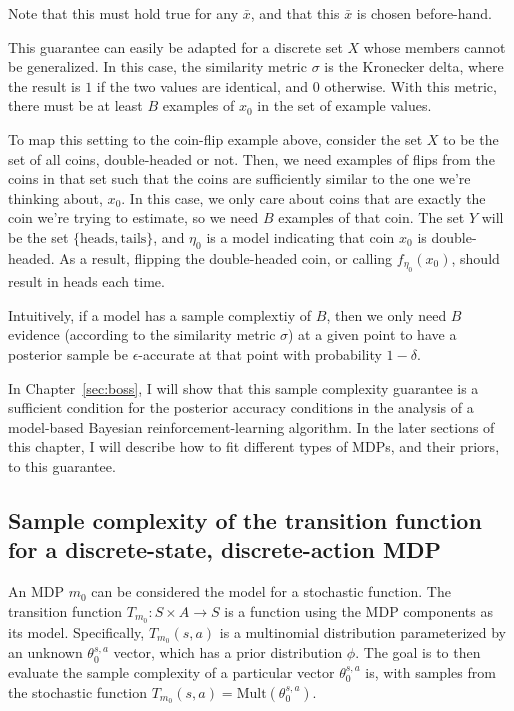 Note that this must hold true for any $\bar x$, and that this $\bar x$ is chosen before-hand.

This guarantee can easily be adapted for a discrete set $X$ whose members cannot be generalized. In this case, the similarity metric $\sigma$ is the Kronecker delta, where the result is $1$ if the two values are identical, and $0$ otherwise. With this metric, there must be at least $B$ examples of $x_0$ in the set of example values. 


To map this setting to the coin-flip example above, consider the set $X$ to be the set of all coins, double-headed or not. Then, we need examples of flips from the coins in that set such that the coins are sufficiently similar to the one we're thinking about, $x_0$. In this case, we only care about coins that are exactly the coin we're trying to estimate, so we need $B$ examples of that coin. The set $Y$ will be the set $\{\mbox{heads},\mbox{tails}\}$, and $\eta_0$ is a model indicating that coin $x_0$ is double-headed. As a result, flipping the double-headed coin, or calling $f_{\eta_0}(x_0)$, should result in heads each time.

Intuitively, if a model has a sample complextiy of $B$, then we only need $B$ evidence (according to the similarity metric $\sigma$) at a given point to have a posterior sample be $\epsilon$-accurate at that point with probability $1-\delta$.

In Chapter~\ref{sec:boss}, I will show that this sample complexity guarantee is a sufficient condition for the posterior accuracy conditions in the analysis of a model-based Bayesian reinforcement-learning algorithm. In the later sections of this chapter, I will describe how to fit different types of MDPs, and their priors, to this guarantee.

\subsection{Sample complexity of the transition function for a discrete-state, discrete-action MDP}

An MDP $m_0$ can be considered the model for a stochastic function. The transition function $T_{m_0}:S \times A \rightarrow S$ is a function using the MDP components as its model. Specifically, $T_{m_0}(s,a)$ is a multinomial distribution parameterized by an unknown $\theta_0^{s,a}$ vector, which has a prior distribution $\phi$. The goal is to then evaluate the sample complexity of a particular vector $\theta_0^{s,a}$ is, with samples from the stochastic function $T_{m_0}(s,a) = \mbox{Mult}(\theta_0^{s,a})$.

